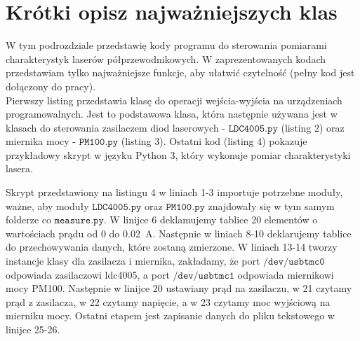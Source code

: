 \section{Krótki opisz najważniejszych klas}
W tym podrozdziale przedstawię kody programu do sterowania pomiarami charakterystyk laserów półprzewodnikowych. W zaprezentowanych kodach przedstawiam tylko najważniejsze funkcje, aby ułatwić czytelność (pełny kod jest dołączony do pracy). \\
Pierwszy listing przedstawia klasę do operacji wejścia-wyjścia na urządzeniach programowalnych. Jest to podstawowa klasa, która następnie używana jest w klasach do sterowania zasilaczem diod laserowych - $\mathtt{LDC4005.py}$ (listing 2) oraz miernika mocy - $\mathtt{PM100.py}$ (listing 3). Ostatni kod (listing 4) pokazuje przykładowy skrypt w języku Python 3, który wykonuje pomiar charakterystyki lasera.
\newpage



Skrypt przedstawiony na listingu 4 w liniach 1-3 importuje potrzebne moduły, ważne, aby moduły $\mathtt{LDC4005.py}$ oraz $\mathtt{PM100.py}$ znajdowały się w tym samym folderze co $\mathtt{measure.py}$.
W linijce 6 deklamujemy tablice 20 elementów o wartościach prądu od 0 do 0.02 \,A. Następnie w liniach 8-10 deklarujemy tablice do przechowywania danych, które zostaną zmierzone. W liniach 13-14 tworzy instancje klasy dla zasilacza i miernika, zakładamy, że port $\mathtt{/dev/usbtmc0}$ odpowiada zasilaczowi ldc4005, a port $\mathtt{/dev/usbtmc1}$ odpowiada miernikowi mocy PM100.
Następnie w linijce 20 ustawiany prąd na zasilaczu, w 21 czytamy prąd z zasilacza, w 22 czytamy napięcie, a w 23 czytamy moc wyjściową na mierniku mocy. Ostatni etapem jest zapisanie danych do pliku tekstowego w linijce 25-26.

